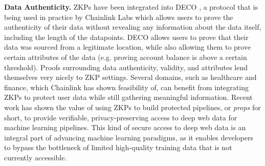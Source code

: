 \textbf{Data Authenticity. }
ZKPs have been integrated into DECO \cite{zhang2020deco}, a protocol that is being used in practice by Chainlink Labs \cite{breidenbach2021chainlink} which allows users to prove the authenticity of their data without revealing any information about the data itself, including the length of the datapoints. DECO allows users to prove that their data was sourced from a legitimate location, while also allowing them to prove certain attributes of the data (e.g. proving account balance is above a certain threshold). Proofs surrounding data authenticity, validity, and attributes lend themselves very nicely to ZKP settings. Several domains, such as healthcare and finance, which Chainlink has shown feasibility of, can benefit from integrating ZKPs to protect user data while still gathering meaningful information. Recent work \cite{juels2024props} has shown the value of using ZKPs to build protected pipelines, or \textit{props} for short, to provide verifiable, privacy-preserving access to deep web data for machine learning pipelines. This kind of secure access to deep web data is an integral part of advancing machine learning paradigms, as it enables developers to bypass the bottleneck of limited high-quality training data that is not currently accessible.



